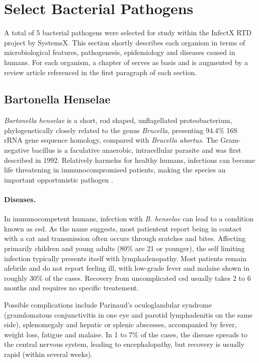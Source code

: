 \section{Select Bacterial Pathogens}

A total of 5 bacterial pathogens were selected for study within the InfectX RTD project by SystemsX. This section shortly describes each organism in terms of microbiological features, pathogenesis, epidemiology and diseases caused in humans. For each organism, a chapter of \cite{Rolain2006} serves as basis and is augmented by a review article referenced in the first paragraph of each section.

\subsection{Bartonella Henselae}

\textit{Bartonella henselae} is a short, rod shaped, unflagellated proteobacterium, phylogenetically closely related to the genus \textit{Brucella}, presenting 94.4\% 16S rRNA gene sequence homology, compared with \textit{Brucella abortus}. The Gram-negative bacillus is a faculative anaerobic, intracellular parasite and was first described in 1992. Relatively harmelss for healthy humans, infections can become life threatening in immunocompromised patients, making the species an important opportunistic pathogen \citep{Anderson1997}.


\paragraph{Diseases.}
In immunocompetent humans, infection with \textit{B. henselae} can lead to a condition known as \gls{csd}. As the name suggests, most patientent report being in contact with a cat and transmission often occurs through sratches and bites. Affecting primarily children and young adults (80\% are 21 or younger), the self limiting infection typically presents itself with lymphadenopathy. Most patients remain afebrile and do not report feeling ill, with low-grade fever and malaise shown in roughly 30\% of the cases. Recovery from uncomplicated \gls{csd} usually takes 2 to 6 months and requires no specific treatement.

Possible complications include Parinaud's oculoglandular syndrome (granulomatous conjunctivitis in one eye and parotid lymphadenitis on the same side), splenomegaly and hepatic or splenic abscesses, accompanied by fever, weight loss, fatigue and malaise. In 1 to 7\% of the cases, the disease spreads to the central nervous system, leading to encephalopathy, but recovery is usually rapid (within several weeks).

